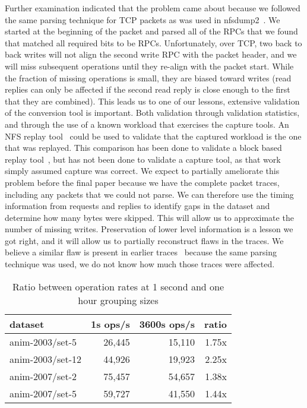 Further examination indicated that the problem came about because we
followed the same parsing technique for TCP packets as was used in
nfsdump2~\cite{ellardTraces}.  We started at the beginning of the
packet and parsed all of the RPCs that we found that matched all
required bits to be RPCs.  Unfortunately, over TCP, two back to back
writes will not align the second write RPC with the packet header, and
we will miss subsequent operations until they re-align with the packet
start.  While the fraction of missing operations is small, they are
biased toward writes (read replies can only be affected if the second
read reply is close enough to the first that they are combined).  This
leads us to one of our lessons, extensive validation of the conversion
tool is important.  Both validation through validation statistics, and
through the use of a known workload that exercises the capture tools.
An NFS replay tool~\cite{NingningFast05} could be used to validate
that the captured workload is the one that was replayed.  This
comparison has been done to validate a block based replay
tool~\cite{AndersonFast04}, but has not been done to validate a
capture tool, as that work simply assumed capture was correct.  We
expect to partially ameliorate this problem before the final paper
because we have the complete packet traces, including any packets that
we could not parse.  We can therefore use the timing information from
requests and replies to identify gaps in the dataset and determine how
many bytes were skipped.  This will allow us to approximate the number
of missing writes.  Preservation of lower level information is a
lesson we got right, and it will allow us to partially reconstruct
flaws in the traces.  We believe a similar flaw is present in earlier
traces~\cite{ellardTraces} because the same parsing technique was
used, we do not know how much those traces were affected.

\begin{table}
\begin{tabular}{|l|r|r|r|}
\hline
dataset & 1s ops/s & 3600s ops/s & ratio \\
\hline
anim-2003/set-5  & 26,445 & 15,110 & 1.75x \\
anim-2003/set-12 & 44,926 & 19,923 & 2.25x \\
anim-2007/set-2  & 75,457 & 54,657 & 1.38x \\
anim-2007/set-5  & 59,727 & 41,550 & 1.44x \\
\hline
\end{tabular}
\caption{Ratio between operation rates at 1 second and one hour grouping sizes}
\label{table:99quant-differences}
\end{table}

